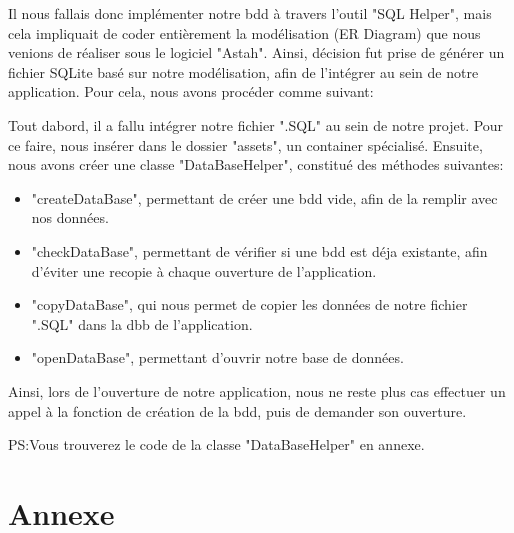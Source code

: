 \documentclass[french,a4paper,12pt]{report}
\begin{document}
Il nous fallais donc implémenter notre bdd à travers l'outil "SQL Helper", mais
cela impliquait de coder entièrement la modélisation (ER Diagram) que nous
venions de réaliser sous le logiciel "Astah".
Ainsi, décision fut prise de générer un fichier SQLite basé sur notre modélisation,
afin de l'intégrer au sein de notre application. Pour cela, nous avons procéder
comme suivant:

Tout dabord, il a fallu intégrer notre fichier ".SQL" au sein de notre projet.
Pour ce faire, nous insérer dans le dossier "assets", un container spécialisé.
Ensuite, nous avons créer une classe "DataBaseHelper", constitué des méthodes
suivantes:
\begin{itemize}
  \item "createDataBase", permettant de créer une bdd vide, afin de la remplir avec
  nos données.
  \item "checkDataBase", permettant de vérifier si une bdd est déja existante, afin
  d'éviter une recopie à chaque ouverture de l'application.
  \item "copyDataBase", qui nous permet de copier les données de notre fichier ".SQL"
  dans la dbb de l'application.
  \item "openDataBase", permettant d'ouvrir notre base de données.
\end{itemize}
Ainsi, lors de l'ouverture de notre application, nous ne reste plus cas effectuer
un appel à la fonction de création de la bdd, puis de demander son ouverture. \newline

PS:Vous trouverez le code de la classe "DataBaseHelper" en annexe.

\chapter{Annexe}
\end{document}
